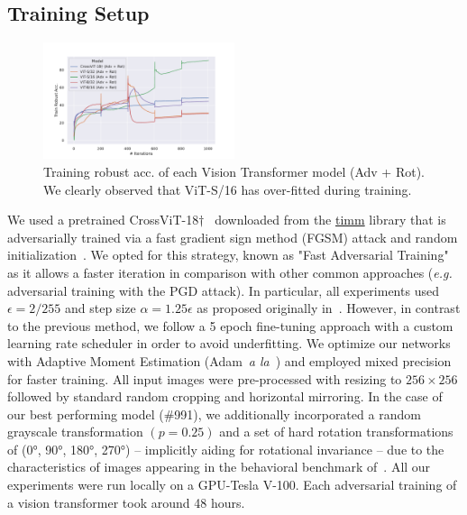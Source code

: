 \documentclass{article} %
\begin{document}
\subsection{Training Setup}
\label{sec:Training_Setup}\begin{figure}
\centering
    \includegraphics[width=0.5\textwidth]{src/train_loss_transformers.pdf}
    \caption{Training robust acc. of each Vision Transformer model (Adv + Rot). We clearly observed that ViT-S/16 has over-fitted during training.}
    \label{fig:train_robust_acc}
\end{figure}
We used a pretrained CrossViT-18$\dagger$~\citep{chen2021crossvit} downloaded from the \href{https://github.com/rwightman/pytorch-image-models}{timm} library that is adversarially trained via a fast gradient sign method (FGSM) attack and random initialization~\citep{wong2020fast}. We opted for this strategy, known as "Fast Adversarial Training" as it allows a faster iteration in comparison with other common approaches (\textit{e.g.} adversarial training with the PGD attack). In particular, all experiments used  $\epsilon = 2/255$ and step size $\alpha = 1.25\epsilon$ as proposed originally in~\citep{wong2020fast}. However, in contrast to the previous method, we follow a 5 epoch fine-tuning approach with a custom learning rate scheduler in order to avoid underfitting. We optimize our networks with Adaptive Moment Estimation (Adam~\textit{a la}~\cite{kingma2014adam}) and employed mixed precision for faster training. All input images were pre-processed with resizing to $256\times256$ followed by standard random cropping and horizontal mirroring. In the case of our best performing model (\#991), we additionally incorporated a random grayscale transformation $(p=0.25)$ and a set of hard rotation transformations of (0°, 90°, 180°, 270°) -- implicitly aiding for rotational invariance -- due to the characteristics of images appearing in the behavioral benchmark of~\cite{Rajalingham240614}. All our experiments were run locally on a GPU-Tesla V-100. Each adversarial training of a vision transformer took around 48 hours.
\end{document}
